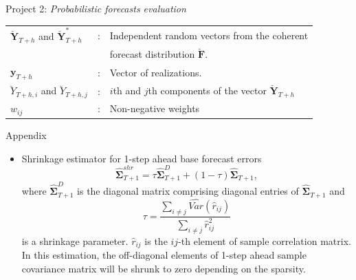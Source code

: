 \documentclass[11pt,xcolor=dvipsnames,table]{beamer} %
\begin{document}
\begin{frame}[noframenumbering]{Project 2: \textit{Probabilistic forecasts evaluation}}
\begin{itemize}
	\begin{table}
		\small
		\centering %
		\begin{tabular}{lll}
			\toprule
			$\breve{\bm{Y}}_{T+h}$ and $\breve{\bm{Y}}^*_{T+h}$ & : & Independent random vectors from the coherent \\
			& & forecast distribution $\breve{\bm{F}}$.\\
			$\bm{y}_{T+h}$ & : &Vector of realizations. \\
			$\breve{Y}_{T+h,i}$ and $\breve{Y}_{T+h,j}$ & : & $i$th and $j$th components of the vector $\breve{\bm{Y}}_{T+h}$ \\
			$w_{ij}$ & : & Non-negative weights\\
			\bottomrule
		\end{tabular}
	\end{table}
	
\end{itemize}

\end{frame}


\begin{frame}[noframenumbering]{Appendix}
\begin{itemize}
	\item \hypertarget{Shrinkage}{} Shrinkage estimator for 1-step ahead base forecast errors
	$$
	\hat{\bm{\Sigma}}_{T+1}^{shr} = \tau\hat{\bm{\Sigma}}_{T+1}^D + (1-\tau)\hat{\bm{\Sigma}}_{T+1},
	$$
	where $\hat{\bm{\Sigma}}_{T+1}^D$ is the diagonal matrix comprising diagonal entries of $\hat{\bm{\Sigma}}_{T+1}$ and $$\tau = \frac{\sum_{i \ne j}\hat{Var}(\hat{r}_{ij})}{\sum_{i \ne j}\hat{r}_{ij}^2}$$ is a shrinkage parameter. $\hat{r}_{ij}$ is the $ij$-th element of sample correlation matrix.  In this estimation, the off-diagonal elements of 1-step ahead sample covariance matrix will be shrunk to zero depending on the sparsity.
	
\end{itemize}
\end{frame}
\end{document}
